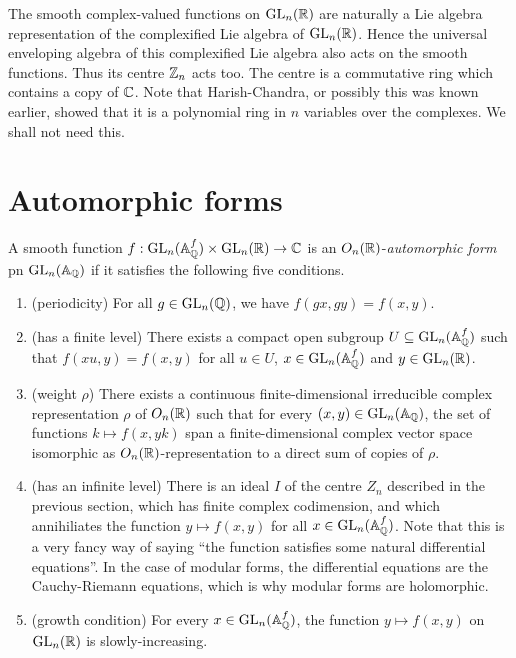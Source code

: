 The smooth complex-valued functions on $\operatorname{GL}_n(\mathbb{R})$ are naturally a Lie algebra representation
of the complexified Lie algebra of $\operatorname{GL}_n(\mathbb{R})$. Hence the universal enveloping algebra of this
complexified Lie algebra also acts on the smooth functions. Thus its centre $\mathbb{Z}_n$ acts too. The
centre is a commutative ring which contains a copy of $\mathbb{C}$. Note that Harish-Chandra, or possibly
this was known earlier, showed that it is a polynomial ring in $n$ variables over the complexes.
We shall not need this.

\section{Automorphic forms}

\begin{definition} A smooth function $f:\operatorname{GL}_n(\mathbb{A}_{\mathbb{Q}}^f)\times\operatorname{GL}_n(\mathbb{R})\to\mathbb{C}$ is
  an $O_n(\mathbb{R})$-\emph{automorphic form} pn $\operatorname{GL}_n(\mathbb{A}_{\mathbb{Q}})$ if it satisfies the following
  five conditions.

  \begin{enumerate}
    \item (periodicity) For all $g\in\operatorname{GL}_n(\mathbb{Q})$, we have $f(gx,gy)=f(x,y)$.
    \item (has a finite level) There exists a compact open subgroup $U\subseteq\operatorname{GL}_n(\mathbb{A}_{\mathbb{Q}}^f)$
      such that $f(xu,y)=f(x,y)$ for all $u\in U$, $x\in \operatorname{GL}_n(\mathbb{A}_{\mathbb{Q}}^f)$ and $y\in\operatorname{GL}_n(\mathbb{R})$.
    \item (weight $\rho$) There exists a continuous finite-dimensional irreducible complex
    representation $\rho$ of $O_n(\mathbb{R})$ such that for every $(x,y)\in\operatorname{GL}_n(\mathbb{A}_{\mathbb{Q}})$, the
    set of functions $k\mapsto f(x,yk)$ span a finite-dimensional complex vector space isomorphic
    as $O_n(\mathbb{R})$-representation to a direct sum of copies of $\rho$.
    \item (has an infinite level) There is an ideal $I$ of the centre $Z_n$ described in the
  previous section, which has finite complex codimension, and which annihiliates the
  function $y \mapsto f(x,y)$ for all $x\in \operatorname{GL}_n(\mathbb{A}_{\mathbb{Q}}^f)$. Note that this is a very fancy
  way of saying ``the function satisfies some natural differential equations''. In the
  case of modular forms, the differential equations are the Cauchy-Riemann equations, which
  is why modular forms are holomorphic.
    \item (growth condition) For every $x\in\operatorname{GL}_n(\mathbb{A}_{\mathbb{Q}}^f)$, the function $y\mapsto f(x,y)$
  on $\operatorname{GL}_n(\mathbb{R})$ is slowly-increasing.
  \end{enumerate}

\end{definition}

